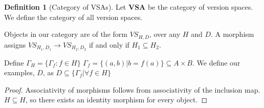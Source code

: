 \documentclass{article}
\theoremstyle{definition}
\newtheorem{definition}{Definition}[section]
\begin{document}
\begin{definition}[Category of VSAs]
Let \textbf{VSA} be the category of version spaces. We define the category of all version spaces. 

Objects in our category are of the form $VS_{H,D}$, over any $H$ and $D$. A morphism assigns $VS_{H_1, D_1} \rightarrow VS_{H_2, D_2}$ if and only if $H_1 \subseteq H_2$.
\end{definition}
Define $\Gamma_H = \{\Gamma_f : f \in H\}$
$\Gamma_f = \{(a,b) | b = f(a)\} \subseteq A\times B$. We define our examples, $D$, as $D\subseteq \{\Gamma_f | \forall f \in H\}$

\begin{proof}
Associativity of morphisms follows from associativity of the inclusion map. $H \subseteq H$, so there exists an identity morphism for every object. 
\end{proof}
\end{document}
